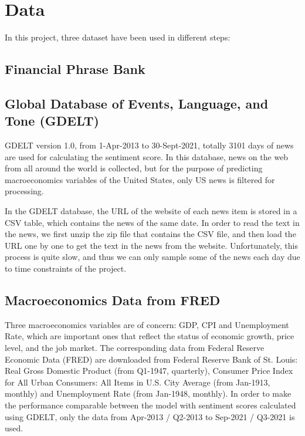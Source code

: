 \documentclass[11pt,a4paper]{article}
\begin{document}
\section{Data}

In this project, three dataset have been used in different steps:

\subsection{Financial Phrase Bank}


\subsection{Global Database of Events, Language, and Tone (GDELT)}

GDELT version 1.0, from 1-Apr-2013 to 30-Sept-2021, totally 3101 days of news are used for calculating the sentiment score. In this database, news on the web from all around the world is collected, but for the purpose of predicting macroeconomics variables of the United States, only US news is filtered for processing.

In the GDELT database, the URL of the website of each news item is stored in a CSV table, which contains the news of the same date. In order to read the text in the news, we first unzip the zip file that contains the CSV file, and then load the URL one by one to get the text in the news from the website. Unfortunately, this process is quite slow, and thus we can only sample some of the news each day due to time constraints of the project.
	

\subsection{Macroeconomics Data from FRED}

Three macroeconomics variables are of concern: GDP, CPI and Unemployment Rate, which are important ones that reflect the status of economic growth, price level, and the job market. The corresponding data from Federal Reserve Economic Data (FRED) are downloaded from Federal Reserve Bank of St. Louis: Real Gross Domestic Product (from Q1-1947, quarterly), Consumer Price Index for All Urban Consumers: All Items in U.S. City Average (from Jan-1913, monthly) and Unemployment Rate (from Jan-1948, monthly). In order to make the performance comparable between the model with sentiment scores calculated using GDELT, only the data from Apr-2013 / Q2-2013 to Sep-2021 / Q3-2021 is used.
\end{document}
